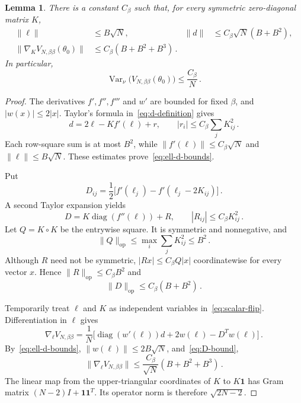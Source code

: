 \documentclass[11pt]{amsart}
\numberwithin{equation}{section}
\newtheorem{lemma}[theorem]{Lemma}
\theoremstyle{remark}
\newcommand{\one}{\mathbf 1}
\newcommand{\Var}{\operatorname{Var}}
\newcommand{\diag}{\operatorname{diag}}
\newcommand{\op}{\mathrm{op}}
\begin{document}
\begin{lemma}\label{lem:gradient}
There is a constant $C_\beta$ such that, for every symmetric zero-diagonal matrix $K$,
\begin{align}
 \|\ell\|&\le B\sqrt N,
 &\|d\|&\le C_\beta\sqrt N(B+B^2),
 \label{eq:ell-d-bounds}\\
 \|\nabla_KV_{N,\beta\beta}(\theta_0)\|
 &\le C_\beta(B+B^2+B^3)\,.
 \label{eq:scalar-gradient}
\end{align}
In particular,
\begin{equation}
 \Var_\nu\bigl(V_{N,\beta\beta}(\theta_0)\bigr)\le\frac{C_\beta}{N}\,.
 \label{eq:scalar-V-concentration}
\end{equation}
\end{lemma}
\begin{proof}
The derivatives $f',f'',f'''$ and $w'$ are bounded for fixed $\beta$, and $|w(x)|\le2|x|$. Taylor's formula in~\eqref{eq:d-definition} gives
\begin{equation}
 d=2\ell-Kf'(\ell)+r,
 \qquad |r_i|\le C_\beta\sum_jK_{ij}^2\,.
 \label{eq:d-expansion}
\end{equation}
Each row-square sum is at most $B^2$, while $\|f'(\ell)\|\le C_\beta\sqrt N$ and $\|\ell\|\le B\sqrt N$. These estimates prove~\eqref{eq:ell-d-bounds}.

Put
\begin{equation*}
 D_{ij}=\frac12\bigl[f'(\ell_j)-f'(\ell_j-2K_{ij})\bigr]\,.
\end{equation*}
A second Taylor expansion yields
\begin{equation}
 D=K\diag(f''(\ell))+R,
 \qquad |R_{ij}|\le C_\beta K_{ij}^2\,.
 \label{eq:D-expansion}
\end{equation}
Let $Q=K\circ K$ be the entrywise square. It is symmetric and nonnegative, and
\begin{equation}
 \|Q\|_\op\le\max_i\sum_jK_{ij}^2\le B^2\,.
 \label{eq:hadamard-bound}
\end{equation}
Although $R$ need not be symmetric, $|Rx|\le C_\beta Q|x|$ coordinatewise for every vector $x$. Hence $\|R\|_\op\le C_\beta B^2$ and
\begin{equation}
 \|D\|_\op\le C_\beta(B+B^2)\,.
 \label{eq:D-bound}
\end{equation}

Temporarily treat $\ell$ and $K$ as independent variables in~\eqref{eq:scalar-flip}. Differentiation in $\ell$ gives
\begin{equation*}
 \nabla_\ell V_{N,\beta\beta}
 =\frac1N\bigl[\diag(w'(\ell))d+2w(\ell)-D^Tw(\ell)\bigr]\,.
\end{equation*}
By~\eqref{eq:ell-d-bounds}, $\|w(\ell)\|\le2B\sqrt N$, and~\eqref{eq:D-bound},
\begin{equation}
 \|\nabla_\ell V_{N,\beta\beta}\|
 \le\frac{C_\beta}{\sqrt N}(B+B^2+B^3)\,.
 \label{eq:ell-gradient}
\end{equation}
The linear map from the upper-triangular coordinates of $K$ to $K\one$ has Gram matrix $(N-2)I+\one\one^T$. Its operator norm is therefore $\sqrt{2N-2}$.


\end{proof}
\end{document}
